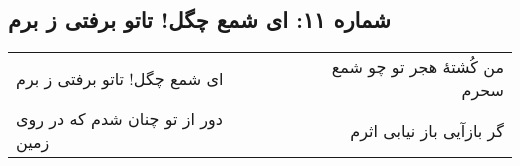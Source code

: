 \begin{center}
\section*{شماره ۱۱: ای شمع چگل! تاتو برفتی ز برم}
\label{sec:011}
\begin{longtable}{l p{0.5cm} r}
ای شمع چگل! تاتو برفتی ز برم
&&
من کُشتهٔ هجر تو چو شمع سحرم
\\
دور از تو چنان شدم که در روی زمین
&&
گر بازآیی باز نیابی اثرم
\\
\end{longtable}
\end{center}
